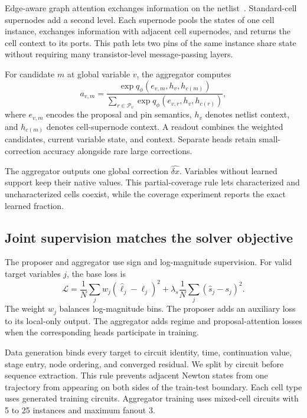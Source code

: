 Edge-aware graph attention exchanges information on the netlist~\cite{velickovic2018gat,brody2022gatv2}. Standard-cell supernodes add a second level. Each supernode pools the states of one cell instance, exchanges information with adjacent cell supernodes, and returns the cell context to its ports. This path lets two pins of the same instance share state without requiring many transistor-level message-passing layers.

For candidate $m$ at global variable $v$, the aggregator computes
\begin{equation}
a_{v,m}=\frac{\exp q_\phi(e_{v,m},h_v,h_{c(m)})}
{\sum_{r\in\mathcal{P}_v}\exp q_\phi(e_{v,r},h_v,h_{c(r)})},
\label{eq:attention}
\end{equation}
where $e_{v,m}$ encodes the proposal and pin semantics, $h_v$ denotes netlist context, and $h_{c(m)}$ denotes cell-supernode context. A readout combines the weighted candidates, current variable state, and context. Separate heads retain small-correction accuracy alongside rare large corrections.

The aggregator outputs one global correction $\widehat{\delta x}$. Variables without learned support keep their native values. This partial-coverage rule lets characterized and uncharacterized cells coexist, while the coverage experiment reports the exact learned fraction.

\subsection{Joint supervision matches the solver objective}

The proposer and aggregator use sign and log-magnitude supervision. For valid target variables $j$, the base loss is
\begin{equation}
\mathcal{L}=\frac{1}{N}\sum_j w_j(\widehat{\ell}_j-\ell_j)^2
+\lambda_s\frac{1}{N}\sum_j(\widehat{s}_j-s_j)^2.
\label{eq:loss}
\end{equation}
The weight $w_j$ balances log-magnitude bins. The proposer adds an auxiliary loss to its local-only output. The aggregator adds regime and proposal-attention losses when the corresponding heads participate in training.

Data generation binds every target to circuit identity, time, continuation value, stage entry, node ordering, and converged residual. We split by circuit before sequence extraction. This rule prevents adjacent Newton states from one trajectory from appearing on both sides of the train-test boundary. Each cell type uses \NumTrainingCircuits{} generated training circuits. Aggregator training uses \NumAggregatorCircuits{} mixed-cell circuits with 5 to 25 instances and maximum fanout 3.

